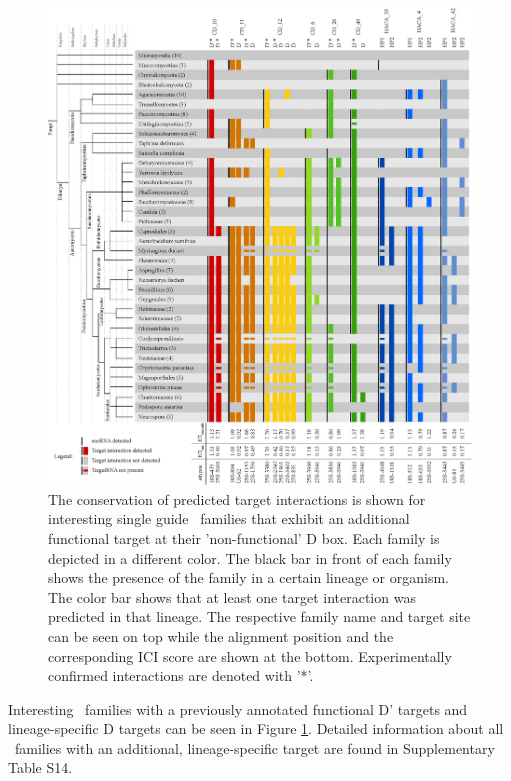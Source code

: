 \begin{figure}
  \centering
  \includegraphics[width=\textwidth]{pics/conservation_lineage_specific_targets.eps}
  \caption{The conservation of predicted target interactions is shown
    for interesting single guide \cd\ families that exhibit an
    additional functional target at their 'non-functional' D box. Each
    family is depicted in a different color. The black bar in front of
    each family shows the presence of the family in a certain lineage
    or organism. The color bar shows that at least one target
    interaction was predicted in that lineage. The respective family
    name and target site can be seen on top while the alignment
    position and the corresponding ICI score are shown at the
    bottom. Experimentally confirmed interactions are denoted with
    '*'.}
  \label{fig:additional_targets}
\end{figure}

Interesting \cd\ families with a previously annotated functional D'
targets and lineage-specific D targets can be seen in Figure
\ref{fig:additional_targets}. Detailed information about all \sno\
families with an additional, lineage-specific target are found in
Supplementary Table S14.

